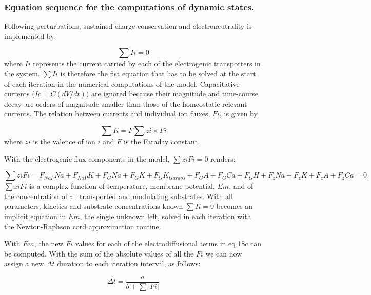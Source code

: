 \documentclass[a4paper]{article}
\newcommand{\F}[2]{F_{#1}#2}
\begin{document}
\subsubsection{Equation sequence for the computations of dynamic states.}
Following perturbations, sustained charge conservation and electroneutrality is implemented by:

\setcounter{equation}{0}
\renewcommand{\theequation}{18\alph{equation}}

\begin{equation}
\sum Ii = 0 
\end{equation}
where $Ii$ represents the current carried by each of the electrogenic transporters in the system. $\sum Ii$ is therefore the fist equation that has to be solved at the start of each iteration in the numerical computations of the model. Capacitative currents ($Ic = C(dV/dt))$ are ignored because their magnitude and time-course decay are orders of magnitude smaller than those of the homeostatic relevant currents.  The relation between currents and individual ion fluxes, $Fi$, is given by 

\begin{equation}
\sum Ii = F\sum zi\times Fi 
\end{equation}
where $zi$ is the valence of ion $i$ and $F$ is the Faraday constant. 

With the electrogenic flux components in the model, $\sum ziFi = 0$ renders:

\begin{equation}
\sum ziFi = \F{NaP}{Na} + \F{NaP}{K} + \F{G}{Na} + \F{G}{K} + \F{G}{K_{Gardos}} + \F{G}{A} + \F{G}{Ca} + \F{G}{H} + \F{z}{Na} + \F{z}{K} + \F{z}{A} + \F{z}{Ca} = 0
\end{equation}
$\sum ziFi$ is a complex function of temperature, membrane potential, $Em$, and of the concentration of all transported and modulating substrates.  With all parameters, kinetics and substrate concentrations known $\sum Ii = 0$ becomes an implicit equation in $Em$, the single unknown left, solved in each iteration with the Newton-Raphson cord approximation routine.      

With $Em$, the new $Fi$ values for each of the electrodiffusional terms in eq 18c can be computed.  With the sum of the absolute values of all the $Fi$ we can now assign a new $\Delta t$ duration to each iteration interval, as follows:  

\setcounter{equation}{18}
\renewcommand{\theequation}{\arabic{equation}}
\begin{equation}
\Delta t = \frac{a}{b + \sum|Fi|}
\end{equation}
\end{document}
